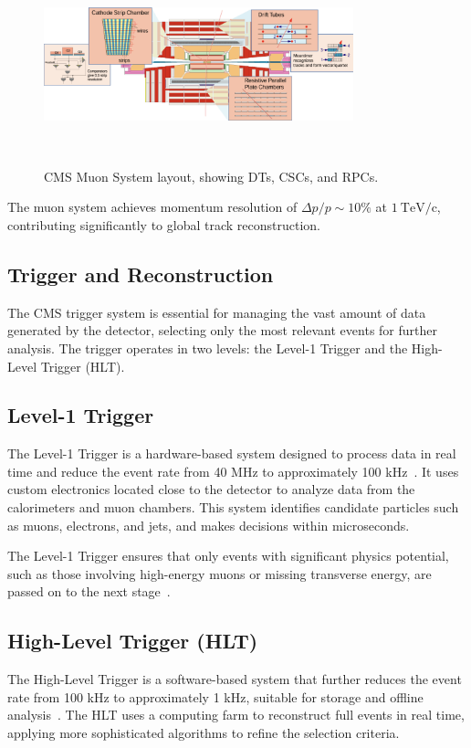 \begin{figure}[ht]
    \centering
    \includegraphics[width=0.8\textwidth]{Figures/muon_detector.png} %
    \caption{CMS Muon System layout, showing DTs, CSCs, and RPCs.}~\cite{muon_detector}
    \label{fig:muon_detector}
\end{figure}

The muon system achieves momentum resolution of $\Delta p / p \sim 10\%$ at $1~\mathrm{TeV/c}$, contributing significantly to global track reconstruction.~\cite{cms_tdr_muon}

\subsection{Trigger and Reconstruction}
The CMS trigger system is essential for managing the vast amount of data generated by the detector, selecting only the most relevant events for further analysis. The trigger operates in two levels: the Level-1 Trigger and the High-Level Trigger (HLT).

\subsection{Level-1 Trigger}
The Level-1 Trigger is a hardware-based system designed to process data in real time and reduce the event rate from 40 MHz to approximately 100 kHz~\cite{trigger_tdr}. It uses custom electronics located close to the detector to analyze data from the calorimeters and muon chambers. This system identifies candidate particles such as muons, electrons, and jets, and makes decisions within microseconds.

The Level-1 Trigger ensures that only events with significant physics potential, such as those involving high-energy muons or missing transverse energy, are passed on to the next stage~\cite{trigger_tdr}.

\subsection{High-Level Trigger (HLT)}
The High-Level Trigger is a software-based system that further reduces the event rate from 100 kHz to approximately 1 kHz, suitable for storage and offline analysis~\cite{trigger_tdr}. The HLT uses a computing farm to reconstruct full events in real time, applying more sophisticated algorithms to refine the selection criteria.

